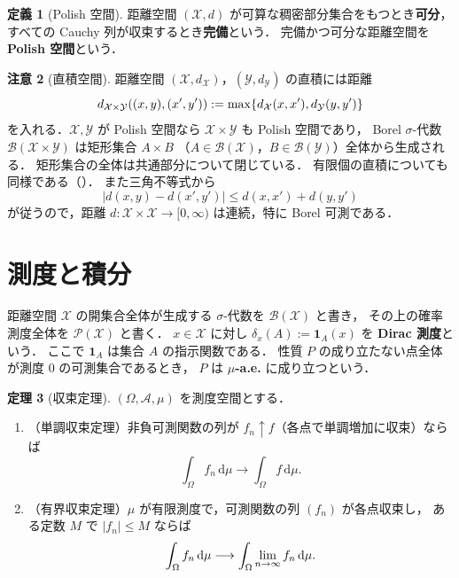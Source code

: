 \documentclass[12pt,a4j,twoside]{jreport}
\numberwithin{equation}{chapter}
\theoremstyle{definition} %
\newtheorem{thm}{定理}[chapter]
\newtheorem{dfn}[thm]{定義}
\newtheorem{rem}[thm]{注意}
\renewcommand{\max}{\mathop{\rm max}\limits} %
\renewcommand{\lim}{\mathop{\rm lim}\limits} %
\newcommand{\X}{\mathcal{X}}
\newcommand{\Y}{\mathcal{Y}}
\newcommand{\Borel}{\mathcal{B}}
\newcommand{\Prob}{\mathcal{P}}
\newcommand{\abs}[1]{\lvert #1\rvert}
\renewcommand{\d}{\mathrm{d}} %
\begin{document}
\begin{dfn}[Polish 空間]\label{dfn:polish}
  距離空間 $(\X,d)$ が可算な稠密部分集合をもつとき\textbf{可分}，
  すべての Cauchy 列が収束するとき\textbf{完備}という．
  完備かつ可分な距離空間を \textbf{Polish 空間}という．
\end{dfn}

\begin{rem}[直積空間]\label{rem:product-space}
  距離空間 $(\X,d_\X)$，$(\Y,d_\Y)$ の直積には距離
  \[
    d_{\X\times\Y}((x,y),(x',y')):=\max\{d_\X(x,x'),d_\Y(y,y')\}
  \]
  を入れる．$\X,\Y$ が Polish 空間なら $\X\times\Y$ も Polish 空間であり，
  Borel $\sigma$-代数 $\Borel(\X\times\Y)$ は矩形集合 $A\times B$
  （$A\in\Borel(\X)$，$B\in\Borel(\Y)$）全体から生成される．
  矩形集合の全体は共通部分について閉じている．
  有限個の直積についても同様である（\cite{Dudley}）．
  また三角不等式から
  \[
    \abs{d(x,y)-d(x',y')}\leq d(x,x')+d(y,y')
  \]
  が従うので，距離 $d\colon\X\times\X\to[0,\infty)$ は連続，特に Borel 可測である．
\end{rem}

\section{測度と積分}

距離空間 $\X$ の開集合全体が生成する $\sigma$-代数を $\Borel(\X)$ と書き，
その上の確率測度全体を $\Prob(\X)$ と書く．
$x\in\X$ に対し $\delta_x(A):=\mathbf{1}_A(x)$ を \textbf{Dirac 測度}という．
ここで $\mathbf{1}_A$ は集合 $A$ の指示関数である．
性質 $P$ の成り立たない点全体が測度 $0$ の可測集合であるとき，
$P$ は \textbf{$\mu$-a.e.} に成り立つという．

\begin{thm}[収束定理]\label{thm:convergence}
  $(\Omega,\mathcal{A},\mu)$ を測度空間とする．
  \begin{enumerate}
    \item （単調収束定理）非負可測関数の列が $f_n\uparrow f$（各点で単調増加に収束）ならば
      \[
        \int_\Omega f_n\,\d\mu\longrightarrow\int_\Omega f\,\d\mu.
      \]
    \item （有界収束定理）$\mu$ が有限測度で，可測関数の列 $(f_n)$ が各点収束し，
      ある定数 $M$ で $\abs{f_n}\leq M$ ならば
      \[
        \int_\Omega f_n\,\d\mu\longrightarrow\int_\Omega\lim_{n\to\infty}f_n\,\d\mu.
      \]
  \end{enumerate}
\end{thm}
\end{document}

